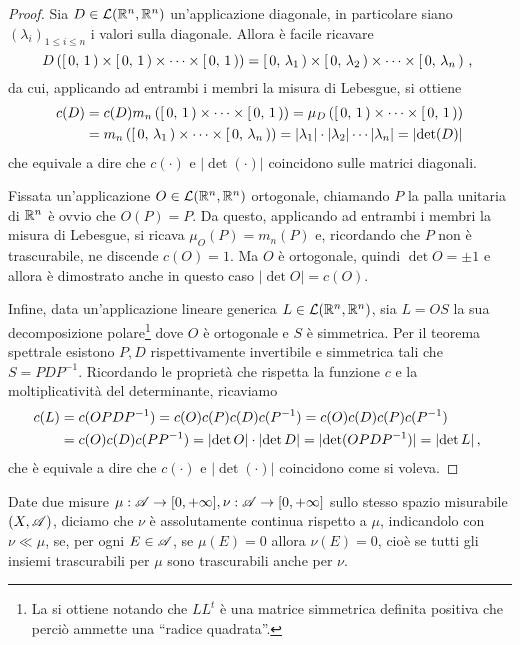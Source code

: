\begin{proof}
	Sia $D\in\mathcal L(\mathbb R^n,\mathbb R^n)$ un'applicazione diagonale, in particolare siano $(\lambda_i)_{1\le i\le n}$ i valori sulla diagonale.
	Allora è facile ricavare
	\begin{equation*}
		D\left(\left[\,0,\,1\,\right)\times\left[\,0,\,1\,\right)\times\dots\times\left[\,0,\,1\,\right)\right)=\left[\,0,\,\lambda_1\,\right)\times\left[\,0,\,\lambda_2\,\right)\times\cdots\times\left[\,0,\,\lambda_n\,\right)\, \text{, }
	\end{equation*}
	da cui, applicando ad entrambi i membri la misura di Lebesgue, si ottiene
	\begin{align*}
		c(D)&=c(D)m_n\left(\left[\,0,\,1\,\right)\times\dots\times\left[\,0,\,1\,\right)\right)=\mu_D\left(\left[\,0,\,1\,\right)\times\dots\times\left[\,0,\,1\,\right)\right)\\
		&=m_n\left(\left[\,0,\,\lambda_1\,\right)\times\cdots\times\left[\,0,\,\lambda_n\,\right)\right)=
		\lvert\lambda_1\rvert\cdot\lvert\lambda_2\rvert\cdots\lvert\lambda_n\rvert=\lvert\det(D)\rvert
	\end{align*}
	che equivale a dire che $c(\cdot)$ e $\lvert\det(\cdot)\rvert$ coincidono sulle matrici diagonali.
	
	Fissata un'applicazione $O\in\mathcal L(\mathbb R^n,\mathbb R^n)$ ortogonale, chiamando $P$ la palla unitaria di $\mathbb R^n$ è ovvio che $O(P)=P$.
	Da questo, applicando ad entrambi i membri la misura di Lebesgue, si ricava $\mu_O(P)=m_n(P)$ e, ricordando che $P$ non è trascurabile, ne discende $c(O)=1$.
	Ma $O$ è ortogonale, quindi $\det O=\pm 1$ e allora è dimostrato anche in questo caso $\lvert\det O\rvert =c(O)$.
	
	Infine, data un'applicazione lineare generica $L\in\mathcal L(\mathbb R^n,\mathbb R^n)$, sia $L=OS$ la sua decomposizione polare\footnote{La si ottiene notando che $LL^t$ è una matrice simmetrica definita positiva che perciò ammette una ``radice quadrata''.} dove $O$ è ortogonale e $S$ è simmetrica. Per il teorema spettrale esistono $P,D$ rispettivamente invertibile e simmetrica tali che $S=PDP^{-1}$.
	Ricordando le proprietà che rispetta la funzione $c$ e la moltiplicatività del determinante, ricaviamo
	\begin{align*}
		c(L)&=c(OPDP^{-1})=c(O)c(P)c(D)c(P^{-1})=c(O)c(D)c(P)c(P^{-1})\\
		&=c(O)c(D)c(PP^{-1})=\lvert\det O\rvert\cdot\lvert\det D\rvert=\lvert \det(OPDP^{-1})\rvert=\lvert\det L\rvert \, \text{, }
	\end{align*}
	che è equivale a dire che $c(\cdot)$ e $\lvert\det(\cdot)\rvert$ coincidono come si voleva.
\end{proof}

\begin{definition}\label{def:AssolutamenteContinua}
	Date due misure $\mu:\mathscr A\to[0,+\infty],\nu:\mathscr A\to[0,+\infty]$ sullo stesso spazio misurabile $(X,\mathscr A)$, diciamo che $\nu$ è assolutamente continua rispetto a $\mu$, indicandolo con $\nu\ll\mu$, se, per ogni $E\in\mathscr A$, se $\mu(E)=0$ allora $\nu(E)=0$, cioè se tutti gli insiemi trascurabili per $\mu$ sono trascurabili anche per $\nu$.
\end{definition}

